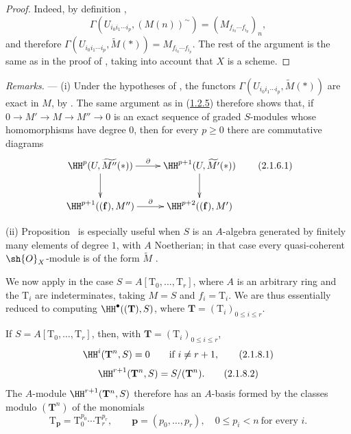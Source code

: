 \begin{proof}
Indeed, by definition ,
\[
  \Gamma(U_{i_0i_1\cdots i_p},(M(n))^\sim)
  =(M_{f_{i_0}\cdots f_{i_p}})_n,
\]
and therefore $\Gamma(U_{i_0i_1\cdots i_p},\widetilde{M}(*))=M_{f_{i_0}\cdots f_{i_p}}$.
The rest of the argument is the same as in the proof of , taking into account that $X$ is a scheme.
\end{proof}

\begin{env}[2.1.6]
\label{III.2.1.6}
\emph{Remarks.} ---
(i) Under the hypotheses of , the functors $\Gamma(U_{i_0i_1\cdots i_p},\widetilde{M}(*))$ are exact in $M$, by .
The same argument as in (\hyperref[III.1.2.5]{1.2.5}) therefore shows that, if $0\to M'\to M\to M''\to0$ is an exact sequence of graded $S$-modules whose homomorphisms have degree $0$, then for every $p\geq0$ there are commutative diagrams
\[
\label{III.2.1.6.1}
  \xymatrix{
    \HH^p(U,\widetilde{M''}(*)) \ar[r]^-\partial \ar[d] &
    \HH^{p+1}(U,\widetilde{M'}(*)) \ar[d] \\
    \HH^{p+1}((\mathbf{f}),M'') \ar[r]^-\partial &
    \HH^{p+2}((\mathbf{f}),M')
  }
  \tag{2.1.6.1}
\]

(ii) Proposition~ is especially useful when $S$ is an $A$-algebra generated by finitely many elements of degree $1$, with $A$ Noetherian; in that case every quasi-coherent $\sh{O}_X$-module is of the form $\widetilde{M}$ .
\end{env}

\begin{env}[2.1.7]
\label{III.2.1.7}
We now apply  in the case $S=A[\mathrm{T}_0,\dots,\mathrm{T}_r]$, where $A$ is an arbitrary ring and the $\mathrm{T}_i$ are indeterminates, taking $M=S$ and $f_i=\mathrm{T}_i$.
We are thus essentially reduced to computing $\HH^\bullet((\mathbf{T}),S)$, where $\mathbf{T}=(\mathrm{T}_i)_{0\leq i\leq r}$.
\end{env}

\begin{lemma}[2.1.8]
\label{III.2.1.8}
If $S=A[\mathrm{T}_0,\dots,\mathrm{T}_r]$, then, with $\mathbf{T}=(\mathrm{T}_i)_{0\leq i\leq r}$,
\[
\label{III.2.1.8.1}
  \HH^i(\mathbf{T}^n,S)=0
  \qquad\text{if }i\neq r+1,
  \tag{2.1.8.1}
\]
\[
\label{III.2.1.8.2}
  \HH^{r+1}(\mathbf{T}^n,S)=S/(\mathbf{T}^n).
  \tag{2.1.8.2}
\]
The $A$-module $\HH^{r+1}(\mathbf{T}^n,S)$ therefore has an $A$-basis formed by the classes modulo $(\mathbf{T}^n)$ of the monomials
\[
  \mathrm{T}_{\mathbf{p}}=\mathrm{T}_0^{p_0}\cdots\mathrm{T}_r^{p_r},
  \qquad \mathbf{p}=(p_0,\dots,p_r),\quad 0\leq p_i<n\ \text{for every }i.
\]
\end{lemma}

